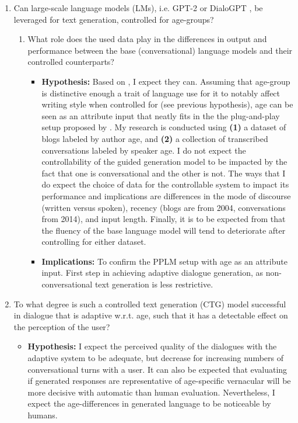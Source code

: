 \begin{enumerate}
    \item Can large-scale language models (LMs), i.e. GPT-2 \citep{radford2019language} or DialoGPT \citep{zhang2019dialogpt}, be leveraged for text generation, controlled for age-groups?
    \begin{enumerate}
        \item What role does the used data play in the differences in output and performance between the base (conversational) language models and their controlled counterparts?
        \begin{itemize}
            \item \textbf{Hypothesis:} Based on \cite{madotto-etal-2020-plug, dathathri2019plug, pennebaker2003words}, I expect they can. Assuming that age-group is distinctive enough a trait of language use for it to notably affect writing style when controlled for (see previous hypothesis), age can be seen as an attribute input that neatly fits in the the plug-and-play setup proposed by \citeauthor{dathathri2019plug}. My research is conducted using \textbf{(1)} a dataset of blogs labeled by author age, and \textbf{(2)} a collection of transcribed conversations labeled by speaker age. I do not expect the controllability of the guided generation model to be impacted by the fact that one is conversational and the other is not. The ways that I do expect the choice of data for the controllable system to impact its performance and implications are differences in the mode of discourse (written versus spoken), recency (blogs are from 2004, conversations from 2014), and input length. Finally, it is to be expected from \cite{dathathri2019plug, madotto-etal-2020-plug} that the fluency of the base language model will tend to deteriorate after controlling for either dataset.
            \item \textbf{Implications:} To confirm the PPLM setup with age as an attribute input. First step in achieving adaptive dialogue generation, as non-conversational text generation is less restrictive.
        \end{itemize}
    \end{enumerate}
    \item To what degree is such a controlled text generation (CTG) model successful in dialogue that is adaptive w.r.t. age, such that it has a detectable effect on the perception of the user?
    \begin{itemize}
        \item \textbf{Hypothesis:} I expect the perceived quality of the dialogues with the adaptive system to be adequate, but decrease for increasing numbers of conversational turns with a user. It can also be expected that evaluating if generated responses are representative of age-specific vernacular will be more decisive with automatic than human evaluation. Nevertheless, I expect the age-differences in generated language to be noticeable by humans. 

\end{itemize}
\end{enumerate}
